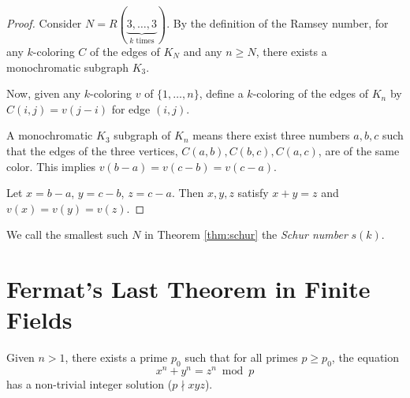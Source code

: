 \begin{proof}
	Consider $N = R(\underbrace{3, \dots, 3}_{k \text{ times}})$. By the definition of the Ramsey number, for any $k$-coloring $C$ of the edges of $K_N$ and any $n \geq N$, there exists a monochromatic subgraph $K_3$.

	Now, given any $k$-coloring $v$ of $\{1, \dots, n\}$, define a $k$-coloring of the edges of $K_n$ by $C(i,j) = v(j-i)$ for edge $(i,j)$.

	A monochromatic $K_3$ subgraph of $K_n$ means there exist three numbers $a, b, c$ such that the edges of the three vertices, $C(a,b), C(b,c), C(a,c)$, are of the same color. This implies $v(b-a) = v(c-b) = v(c-a)$.

	Let $x = b-a$, $y = c-b$, $z = c-a$. Then $x, y, z$ satisfy $x + y = z$ and $v(x) = v(y) = v(z)$.

\end{proof}

We call the smallest such $N$ in Theorem \ref{thm:schur} the \emph{Schur number} $s(k)$.

\section{Fermat's Last Theorem in Finite Fields}

\begin{theorem}
	\label{thm:flt-finite-fields}
	Given $n > 1$, there exists a prime $p_0$ such that for all primes $p \geq p_0$, the equation
	\[
		x^n + y^n = z^n \bmod p
	\]
	has a non-trivial integer solution ($p \nmid xyz$).
\end{theorem}

